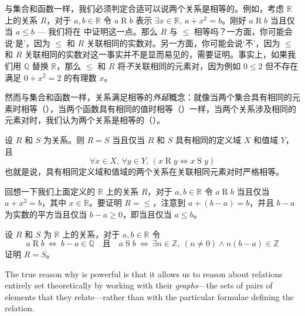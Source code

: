 与集合和函数一样，我们必须判定合适可以说两个关系是相等的。例如，考虑 $\mathbb{R}$ 上的关系 $R$，对于 $a,b \in \mathbb{R}$ 令 $a \mathrel{R} b$ 表示 $\exists x \in \mathbb{R},~ a+x^2=b$。刚好 $a \mathbin{R} b$ 当且仅当 $a \le b$ --- 我们将在  中证明这一点。那么 $R$ 与 $\le$ 相等吗？一方面，你可能会说`是'，因为 $\le$ 和 $R$ 关联相同的实数对。另一方面，你可能会说`不'，因为 $\le$ 和 $R$ 关联相同的实数对这一事实并不是显而易见的，需要证明。事实上，如果我们用 $\mathbb{Q}$ 替换 $\mathbb{R}$，那么 $\le$ 和 $R$ 将\textit{不}关联相同的元素对，因为例如 $0 \le 2$ 但不存在满足 $0+x^2=2$ 的有理数 $x$。

然而与集合和函数一样，关系满足相等的\textit{外延}概念：就像当两个集合具有相同的元素时相等（），当两个函数具有相同的值时相等（）一样，当两个关系涉及相同的元素对时，我们认为两个关系是相等的（）。

\begin{axiom}[关系外延性]
\label{axRelationEquality}
设 $R$ 和 $S$ 为关系。则 $R = S$ 当且仅当 $R$ 和 $S$ 具有相同的定义域 $X$ 和值域 $Y$，且
\[ \forall x \in X,\, \forall y \in Y,\, (x \mathrel{R} y \Leftrightarrow x \mathrel{S} y) \]
也就是说，具有相同定义域和值域的两个关系在关联相同元素对时严格相等。
\end{axiom}

\begin{example}
\label{exLeqOnRFromAddingSquare}
回想一下我们上面定义的 $\mathbb{R}$ 上的关系 $R$，对于 $a,b \in \mathbb{R}$ 令 $a \mathrel{R} b$ 当且仅当 $a+x^2=b$，其中 $x \in \mathbb{R}$。要证明 $R = {\le}$，注意到 $a + (b-a) = b$，并且 $b-a$ 为实数的平方当且仅当 $b-a \ge 0$，即当且仅当 $a \le b$。
\end{example}

\begin{exercise}
设 $R$ 和 $S$ 为 $\mathbb{R}$ 上的关系，对于 $a,b \in \mathbb{R}$ 令
\[ a \mathrel{R} b ~ \Leftrightarrow ~ b-a \in \mathbb{Q} \quad \text{且} \quad a \mathrel{S} b ~ \Leftrightarrow ~ \exists n \in \mathbb{Z},~ (n \ne 0) \wedge n(b-a) \in \mathbb{Z} \]
证明 $R=S$。
\end{exercise}

The true reason why  is powerful is that it allows us to reason about relations entirely set theoretically by working with their \textit{graphs}---the sets of pairs of elements that they relate---rather than with the particular formulae defining the relation.

